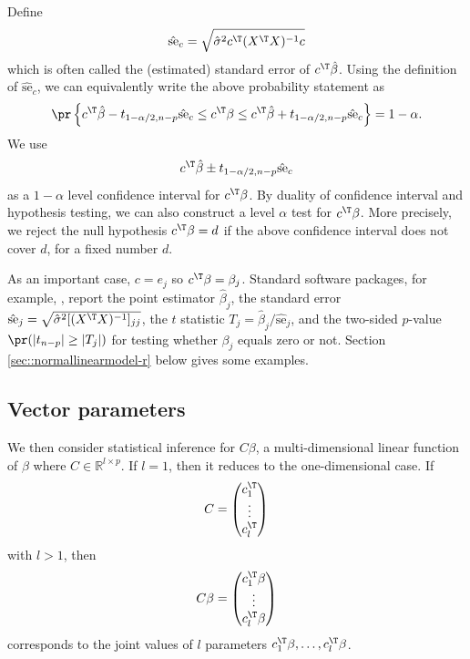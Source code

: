 Define 
$$
\hat{\text{se}}_{c } = 
\sqrt{\hat{\sigma}^{2}c ^{\T}(X^{\T}X)^{-1}c }
$$
which is often called the (estimated) standard error of $c ^{\T}\hat{\beta}$. Using the definition of $\hat{\text{se}}_{c } $,
we can equivalently write the above probability statement as
\[
\pr\left\{ c ^{\T}\hat{\beta}- t_{1-\alpha/2,n-p} \hat{\text{se}}_{c }\leq c ^{\T}\beta\leq c ^{\T}\hat{\beta}+ t_{1-\alpha/2,n-p} \hat{\text{se}}_{c }\right\} =1-\alpha.
\]
We use 
\[
c ^{\T}\hat{\beta} \pm t_{1-\alpha/2,n-p} \hat{\text{se}}_{c } 
\]
as a $1-\alpha$ level confidence interval for $c ^{\T}\beta$. By duality of confidence
interval and hypothesis testing, we can also construct a level $\alpha$
test for $c ^{\T}\beta$. More precisely, we reject the null hypothesis $c ^{\T}\beta = d$ if the above confidence interval does not cover $d$, for a fixed number $d$. 


As an important case, $c=e_j$ so $c^{\T} \beta = \beta_j$. Standard software packages, for example, , report the point estimator $\hat{\beta}_j$, the standard error $\hat{\text{se}}_j = \sqrt{ \hat{\sigma}^2 [(X^{\T}X)^{-1}]_{jj} }$, the $t$ statistic $T_j = \hat{\beta}_j / \hat{\text{se}}_j $, and the two-sided $p$-value $\pr( | t_{n-p} | \geq  |T_j|  )$ for testing whether $\beta_j$ equals zero or not. Section \ref{sec::normallinearmodel-r} below gives some examples. 



\subsection{Vector parameters}
We then consider statistical inference for $C\beta$, a multi-dimensional
linear function of $\beta$ where $C\in\mathbb{R}^{l\times p}.$ If
$l=1$, then it reduces to the one-dimensional case. If 
$$
C = \begin{pmatrix}
c_1^{\T} \\
\vdots \\
c_l^{\T}
\end{pmatrix} 
$$
with $l>1$, then 
$$
C\beta = \begin{pmatrix}
c_1^{\T} \beta \\
\vdots \\
c_l^{\T} \beta
\end{pmatrix}
$$
corresponds to the joint values of $l$ parameters $ c_1^{\T} \beta, \ldots,c_l^{\T} \beta$.

